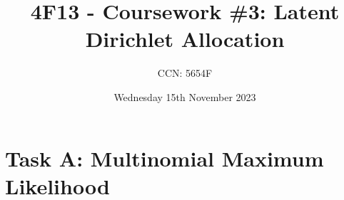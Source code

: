 \documentclass[11pt]{amsart}
\author{CCN: 5654F}
\title[4F13 - Coursework \#3: Latent Dirichlet Allocation]{\vspace{-.4in}4F13 - Coursework \#3: Latent Dirichlet Allocation\vspace{-.2in}}
\date{Wednesday 15th November 2023} %
\begin{document}
\maketitle
\vspace{-.4in}
\section{Task A: Multinomial Maximum Likelihood} \label{sec:a}





\end{document}
